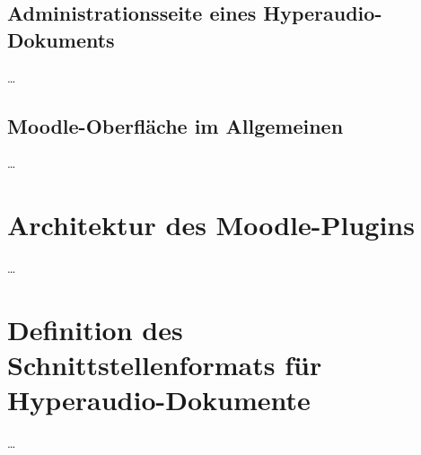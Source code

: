 \subsection{Administrationsseite eines Hyperaudio-Dokuments}
\dots


\subsection{Moodle-Oberfläche im Allgemeinen}
\dots


\section{Architektur des Moodle-Plugins}
\dots


\section{Definition des Schnittstellenformats für Hyperaudio-Dokumente}
\dots

